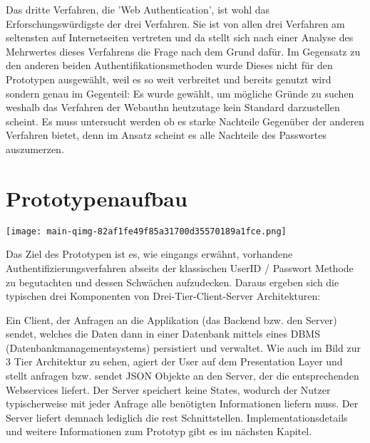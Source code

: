 Das dritte Verfahren, die 'Web Authentication', ist wohl das Erforschungswürdigste der drei Verfahren. Sie ist von allen drei Verfahren am seltensten auf Internetseiten vertreten und da stellt sich nach einer Analyse des Mehrwertes dieses Verfahrens die Frage nach dem Grund dafür. Im Gegensatz zu den anderen beiden Authentifikationsmethoden wurde Dieses nicht für den Prototypen ausgewählt, weil es so weit verbreitet und bereits genutzt wird sondern genau im Gegenteil: Es wurde gewählt, um mögliche Gründe zu suchen weshalb das Verfahren der Webauthn heutzutage kein Standard darzustellen scheint. Es muss untersucht werden ob es starke Nachteile Gegenüber der anderen Verfahren bietet, denn im Ansatz scheint es alle Nachteile des Passwortes auszumerzen.
\newpage

\section{Prototypenaufbau}

\begin{center}
    \center
    \texttt{[image: main-qimg-82af1fe49f85a31700d35570189a1fce.png]}
\end{center} 

Das Ziel des Prototypen ist es, wie eingangs erwähnt, vorhandene Authentifizierungsverfahren abseits der klassischen UserID / Passwort Methode zu begutachten und dessen Schwächen aufzudecken. Daraus ergeben sich die typischen drei Komponenten von Drei-Tier-Client-Server Architekturen:

Ein Client, der Anfragen an die Applikation (das Backend bzw. den Server) sendet, welches die Daten dann in einer Datenbank mittels eines DBMS (Datenbankmanagementsystems) persistiert und verwaltet. Wie auch im Bild zur 3 Tier Architektur zu sehen, agiert der User auf dem Presentation Layer und stellt anfragen bzw. sendet JSON Objekte an den Server, der die entsprechenden Webservices liefert. Der Server speichert keine States, wodurch der Nutzer typischerweise mit jeder Anfrage alle benötigten Informationen liefern muss. Der Server liefert demnach lediglich die \ac{rest} Schnittstellen. Implementationsdetails und weitere Informationen zum Prototyp gibt es im nächsten Kapitel.
